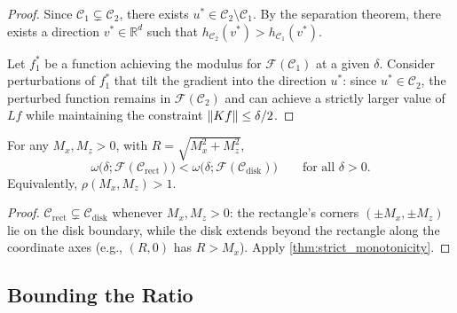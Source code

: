 \begin{proof}
	Since $\mathcal{C}_1 \subsetneq \mathcal{C}_2$, there exists $u^* \in \mathcal{C}_2 \setminus \mathcal{C}_1$.
	By the separation theorem, there exists a direction $v^* \in \mathbb{R}^d$ such that $h_{\mathcal{C}_2}(v^*) > h_{\mathcal{C}_1}(v^*)$.

	Let $f^*_1$ be a function achieving the modulus for $\mathcal{F}(\mathcal{C}_1)$ at a given $\delta$.
	Consider perturbations of $f^*_1$ that tilt the gradient into the direction $u^*$: since $u^* \in \mathcal{C}_2$, the perturbed function remains in $\mathcal{F}(\mathcal{C}_2)$ and can achieve a strictly larger value of $Lf$ while maintaining the constraint $\lVert Kf\rVert \leq \delta/2$.

\end{proof}

\begin{corollary}\label{cor:strict_improvement}
	For any $M_x, M_z > 0$, with $R = \sqrt{M_x^2 + M_z^2}$,
	\begin{equation*}
		\omega\bigl(\delta; \mathcal{F}(\mathcal{C}_{\mathrm{rect}})\bigr) < \omega\bigl(\delta; \mathcal{F}(\mathcal{C}_{\mathrm{disk}})\bigr) \qquad \text{for all } \delta > 0.
	\end{equation*}
	Equivalently, $\rho(M_x, M_z) > 1$.
\end{corollary}

\begin{proof}
	$\mathcal{C}_{\mathrm{rect}} \subsetneq \mathcal{C}_{\mathrm{disk}}$ whenever $M_x, M_z > 0$: the rectangle's corners $({\pm}M_x, {\pm}M_z)$ lie on the disk boundary, while the disk extends beyond the rectangle along the coordinate axes (e.g., $(R, 0)$ has $R > M_x$).
	Apply \cref{thm:strict_monotonicity}.
\end{proof}


\subsection{Bounding the Ratio}\label{sec:tc:ratio}

